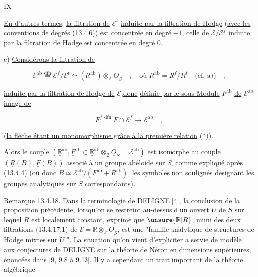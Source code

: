 
\hfill IX

\uline{En d'autres termes}, \uline{la filtration de} $\mathcal{E}^{t}$ \uline{induite par la filtration de Hodge} (\uline{avec les conventions de degrés} (13.4.6)) \uline{est concentrée en degré} $-1$, \uline{celle de} $\mathcal{E}/\mathcal{E}^{f}$ \uline{induite par la filtration de Hodge est concentrée en degré} $0$.

c) \uline{Considérons la filtration de}

\[
\mathcal{E}^{\mathrm{ab}}\overset{\mathrm{dfn}}{=}\mathcal{E}^{f}/\mathcal{E}^{t}\simeq
(\underline{R}^{\mathrm{ab}})\otimes_{\mathbb{Z}}\underline{O}_S
\quad,\quad \text{où }\underline{R}^{\mathrm{ab}}=\underline{R}^{f}/\underline{R}^{t}\quad\text{(cf. a))}\quad,
\]

\uline{induite par la filtration de Hodge de} $\mathcal{E}$,\uline{donc} \uline{définie par le sous-Module} $\underline{F}^{\mathrm{ab}}$ \uline{de} $\mathcal{E}^{\mathrm{ab}}$ \uline{image de}

\[
\underline{F}^{f}\overset{\mathrm{dfn}}{=}\underline{F}\cap\mathcal{E}^{f}\longrightarrow\mathcal{E}^{\mathrm{ab}}\quad ,
\]

(\uline{la flèche étant un monomorphisme grâce à la première relation} (*)).

\uline{Alors le couple} $(\underline{\mathbb{R}}^{\mathrm{ab}},\underline{F}^{\mathrm{ab}}\subset\underline{\mathbb{R}}^{\mathrm{ab}}\otimes_{\mathbb{Z}}\underline{O}_S=\mathcal{E}^{\mathrm{ab}})$ \uline{est isomorphe au couple} $(\underline{R}(B),\underline{F}(B))$ \uline{associé à un} groupe abéloide \uline{sur} $S$, \uline{comme expliqué après} (13.4.4) (\uline{où donc} $B\simeq\mathcal{E}^{\mathrm{ab}}/(F^{\mathrm{ab}}+R^{\mathrm{ab}})$, \uline{les symboles non soulignés désignant les groupes analytiques sur} $S$ \uline{correspondants}).

\uline{Remarque} 13.4.18. Dans la terminologie de DELIGNE [4], la conclusion de la proposition précédente, lorsqu'on se restreint au-dessus d'un ouvert $U$ de $S$ sur lequel $R$ est localement constant, exprime que $\unsure{\mathbb{R}|R}$, muni des deux filtrations (13.4.17.1) de $\mathcal{E}=\underline{\mathbb{R}}\otimes_{\mathbb{Z}}\underline{O}_S$, est une "famille analytique de structures de Hodge mixtes sur $U$ ". La situation qu'on vient d'expliciter a servie de modèle aux conjectures de DELIGNE sur la théorie de Néron en dimensions supérieures, énoncées dans [9, 9.8 à 9.13]. Il y a cependant un trait important de la théorie algébrique



